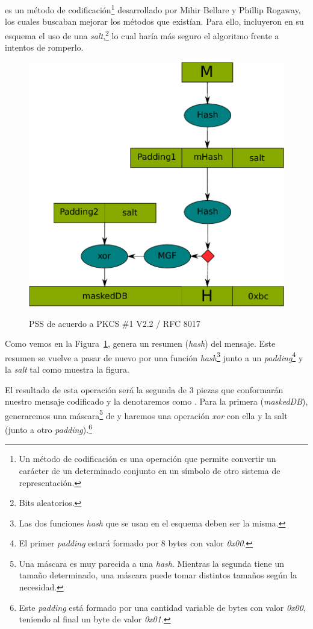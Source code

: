   es un método de codificación\footnote{Un método de codificación es una operación que permite convertir un carácter de un determinado conjunto en un símbolo de otro sistema de representación.}
 desarrollado por Mihir Bellare y Phillip Rogaway, los cuales buscaban mejorar los métodos que existían.
 Para ello, incluyeron en su esquema el uso de una \emph{salt},\footnote{Bits aleatorios.} lo cual haría más seguro el algoritmo frente a intentos de romperlo. \emph{\parencite{Reference15}}

 \begin{figure}[ht]
   \centering
   \includegraphics[scale=2.0]{Figures/PSS}
   \decoRule
   \caption[PSS (Esquema)]{PSS de acuerdo a PKCS \#1 V2.2 / RFC 8017} \emph{\parencite{Reference16}}
   \label{fig:PSS}
 \end{figure}

 Como vemos en la Figura~\ref{fig:PSS},  genera un resumen (\emph{hash}) del mensaje.
 Este resumen se vuelve a pasar de nuevo por una función \emph{hash}\footnote{Las dos funciones \emph{hash} que se usan en el esquema deben ser la misma.} junto a un \emph{padding}\footnote{El primer \emph{padding} estará formado por 8 bytes con valor \emph{0x00}.} y la \emph{salt} tal como muestra la figura.

 El resultado de esta operación será la segunda de 3 piezas que conformarán nuestro mensaje codificado y la denotaremos como .
 Para la primera (\emph{maskedDB}), generaremos una máscara\footnote{Una máscara es muy parecida a una \emph{hash}. Mientras la segunda tiene un tamaño determinado, una máscara puede tomar distintos tamaños según la necesidad.} de  y haremos una operación \emph{xor} con ella y la salt (junto a otro \emph{padding}).\footnote{Este \emph{padding} está formado por una cantidad variable de bytes con valor \emph{0x00}, teniendo al final un byte de valor \emph{0x01}.}


